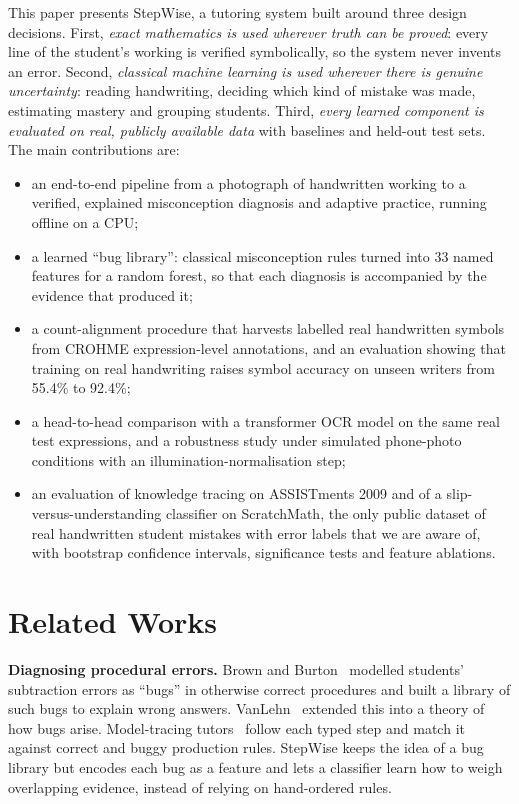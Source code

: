 \documentclass[runningheads]{llncs}
\begin{document}
This paper presents StepWise, a tutoring system built around three design decisions. First, \emph{exact mathematics is used wherever truth can be proved}: every line of the student's working is verified symbolically, so the system never invents an error. Second, \emph{classical machine learning is used wherever there is genuine uncertainty}: reading handwriting, deciding which kind of mistake was made, estimating mastery and grouping students. Third, \emph{every learned component is evaluated on real, publicly available data} with baselines and held-out test sets. The main contributions are:
\begin{itemize}
\item an end-to-end pipeline from a photograph of handwritten working to a verified, explained misconception diagnosis and adaptive practice, running offline on a CPU;
\item a learned ``bug library'': classical misconception rules turned into 33 named features for a random forest, so that each diagnosis is accompanied by the evidence that produced it;
\item a count-alignment procedure that harvests labelled real handwritten symbols from CROHME expression-level annotations, and an evaluation showing that training on real handwriting raises symbol accuracy on unseen writers from 55.4\% to 92.4\%;
\item a head-to-head comparison with a transformer OCR model on the same real test expressions, and a robustness study under simulated phone-photo conditions with an illumination-normalisation step;
\item an evaluation of knowledge tracing on ASSISTments 2009 and of a slip-versus-understanding classifier on ScratchMath, the only public dataset of real handwritten student mistakes with error labels that we are aware of, with bootstrap confidence intervals, significance tests and feature ablations.
\end{itemize}

\section{Related Works}

\textbf{Diagnosing procedural errors.} Brown and Burton~\cite{brown1978} modelled students' subtraction errors as ``bugs'' in otherwise correct procedures and built a library of such bugs to explain wrong answers. VanLehn~\cite{vanlehn1990} extended this into a theory of how bugs arise. Model-tracing tutors~\cite{koedinger1997} follow each typed step and match it against correct and buggy production rules. StepWise keeps the idea of a bug library but encodes each bug as a feature and lets a classifier learn how to weigh overlapping evidence, instead of relying on hand-ordered rules.
\end{document}
